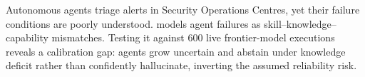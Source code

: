 Autonomous agents triage alerts in Security Operations Centres, yet
their failure conditions are poorly understood. \ARES{} models agent
failures as skill--knowledge--capability mismatches. Testing it against
600 live frontier-model executions reveals a calibration gap: agents
grow uncertain and abstain under knowledge deficit rather than
confidently hallucinate, inverting the assumed reliability risk.
